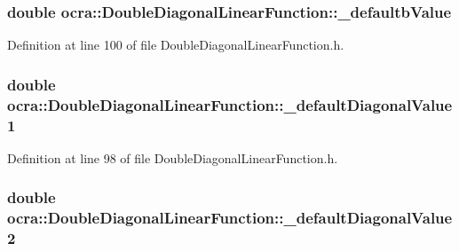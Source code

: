 \subsubsection[{\texorpdfstring{\+\_\+defaultb\+Value}{_defaultbValue}}]{\setlength{\rightskip}{0pt plus 5cm}double ocra\+::\+Double\+Diagonal\+Linear\+Function\+::\+\_\+defaultb\+Value\hspace{0.3cm}{\ttfamily [protected]}}\hypertarget{classocra_1_1DoubleDiagonalLinearFunction_a24ebbdd1093941e346c6931f23d3193f}{}\label{classocra_1_1DoubleDiagonalLinearFunction_a24ebbdd1093941e346c6931f23d3193f}


Definition at line 100 of file Double\+Diagonal\+Linear\+Function.\+h.

\subsubsection[{\texorpdfstring{\+\_\+default\+Diagonal\+Value1}{_defaultDiagonalValue1}}]{\setlength{\rightskip}{0pt plus 5cm}double ocra\+::\+Double\+Diagonal\+Linear\+Function\+::\+\_\+default\+Diagonal\+Value1\hspace{0.3cm}{\ttfamily [protected]}}\hypertarget{classocra_1_1DoubleDiagonalLinearFunction_a7e4daebabaa357edeb050b1a2e08868f}{}\label{classocra_1_1DoubleDiagonalLinearFunction_a7e4daebabaa357edeb050b1a2e08868f}


Definition at line 98 of file Double\+Diagonal\+Linear\+Function.\+h.

\subsubsection[{\texorpdfstring{\+\_\+default\+Diagonal\+Value2}{_defaultDiagonalValue2}}]{\setlength{\rightskip}{0pt plus 5cm}double ocra\+::\+Double\+Diagonal\+Linear\+Function\+::\+\_\+default\+Diagonal\+Value2\hspace{0.3cm}{\ttfamily [protected]}}\hypertarget{classocra_1_1DoubleDiagonalLinearFunction_ac94bc900b6847f9203adcde9d96c20d9}{}\label{classocra_1_1DoubleDiagonalLinearFunction_ac94bc900b6847f9203adcde9d96c20d9}


